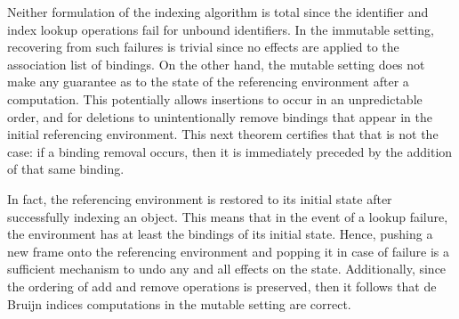Neither formulation of the indexing algorithm is total since the identifier and index lookup operations fail for unbound identifiers.
In the immutable setting, recovering from such failures is trivial since no effects are applied to the association list of bindings.
On the other hand, the mutable setting does not make any guarantee as to the state of the referencing environment after a computation.
This potentially allows insertions to occur in an unpredictable order, and for deletions to unintentionally remove bindings that appear in the initial referencing environment.
This next theorem certifies that that is not the case: if a binding removal occurs, then it is immediately preceded by the addition of that same binding.

In fact, the referencing environment is restored to its initial state after successfully indexing an \LF object.
This means that in the event of a lookup failure, the environment has at least the bindings of its initial state.
Hence, pushing a new frame onto the referencing environment and popping it in case of failure is a sufficient mechanism to undo any and all effects on the state.
Additionally, since the ordering of add and remove operations is preserved, then it follows that de Bruijn indices computations in the mutable setting are correct.

\newcommand{\D}{\mathcal{D}}
\newcommand{\E}{\mathcal{E}}


